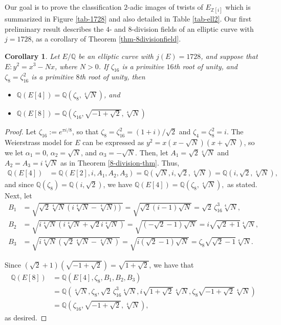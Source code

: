 \documentclass[11pt]{amsart}
\newtheorem{corollary}[defn]{Corollary}
\theoremstyle{definition}
\newcommand{\Q}{\mathbb Q}
\newcommand{\Z}{\mathbb Z}
\begin{document}
Our goal is to prove the classification $2$-adic images of twists of $E_{\Z[i]}$ which is summarized in Figure \ref{tab-1728} and also detailed in Table \ref{tab-ell2}. Our first preliminary result describes the $4$- and $8$-division fields of an elliptic curve with $j=1728$, as a corollary of Theorem \ref{thm-8divisionfield}.

\begin{corollary}\label{cor-8divfieldj1728}
Let $E/\Q$ be an elliptic curve with $j(E) = 1728$, and suppose that $E : y^2 = x^3 -N x$, where  $N>0$. If $\zeta_{16}$ is a primitive $16$th root of unity, and $\zeta_8 = \zeta_{16}^2$ is a primitive $8$th root of unity, then
\begin{itemize}
	\item $\Q(E[4]) = \Q(\zeta_8, \sqrt[4]{N})$, and
	\item $\Q(E[8]) = \Q(\zeta_{16}, \sqrt{-1+\sqrt{2}}, \sqrt[4]{N})$
\end{itemize}
\end{corollary}

\begin{proof}
Let $\zeta_{16} := e^{\pi i/8}$, so that $\zeta_8 = \zeta_{16}^2 = (1 + i)/\sqrt{2}$ and $\zeta_4 = \zeta_8^2 = i$. The Weierstrass model for $E$ can be expressed as $y^2 = x(x - \sqrt{ N})(x + \sqrt{N})$, so we let $\alpha_1 = 0$, $\alpha_2 = \sqrt{ N}$, and $\alpha_3 = - \sqrt{N}$. Then, let $A_1 = \sqrt{2} \sqrt[4]{N}$ and $A_2 = A_3 = i \sqrt[4]{N}$ as in Theorem \ref{8-division-thm}. Thus,
\begin{align*}
\Q(E[4]) &= \Q(E[2], i, A_1, A_2, A_3) = \Q( \sqrt{N}, i, \sqrt{2}, \sqrt[4]{N}) = \Q(i, \sqrt{2}, \sqrt[4]{N}),
\end{align*}
and since $\Q(\zeta_8) = \Q(i, \sqrt{2})$, we have 
$\Q(E[4]) = \Q(\zeta_8, \sqrt[4]{N}),$ as stated. Next, let
\begin{align*}
B_1 &= \sqrt{ \sqrt{2} \sqrt[4]{N} \left(i \sqrt[4]{N} - \sqrt[4]{N} ) \right)} = \sqrt{ \sqrt{2} (i - 1) \sqrt{N} } = \sqrt{2} \, \zeta_{16}^3  \sqrt[4]{N}, \\
B_2 &= \sqrt{ i \sqrt[4]{N} \left( i \sqrt[4]{N} + \sqrt{2} i \sqrt[4]{N} \right) } = \sqrt{ (-\sqrt{2} - 1) \sqrt{N} } = i \sqrt{ \sqrt{2} + 1} \sqrt[4]{N},  \\
B_3 &= \sqrt{ i \sqrt[4]{N} \left( \sqrt{2} \sqrt[4]{N} -  \sqrt[4]{N} \right) } = \sqrt{ i (\sqrt{2} - 1) \sqrt{ N}} = \zeta_8 \sqrt{ \sqrt{2} - 1} \sqrt[4]{N}.
\end{align*}

Since $(\sqrt{2} + 1)(\sqrt{-1+\sqrt{2}}) = \sqrt{1+\sqrt{2}}$, we have that 
\begin{align*}
\Q(E[8]) 
&= \Q(E[4], \zeta_8, B_1, B_2, B_3) \\
&= \Q\left(\sqrt[4]{N}, \zeta_8, \sqrt{2} \, \zeta_{16}^3  \sqrt[4]{N}, i \sqrt{ 1+\sqrt{2}} \sqrt[4]{N},  \zeta_8 \sqrt{ -1+\sqrt{2}} \sqrt[4]{N}\right) \\
&= \Q\left(\zeta_{16}, \sqrt{-1+\sqrt{2}}, \sqrt[4]{N}\right),
\end{align*}
as desired.
\end{proof}
\end{document}
